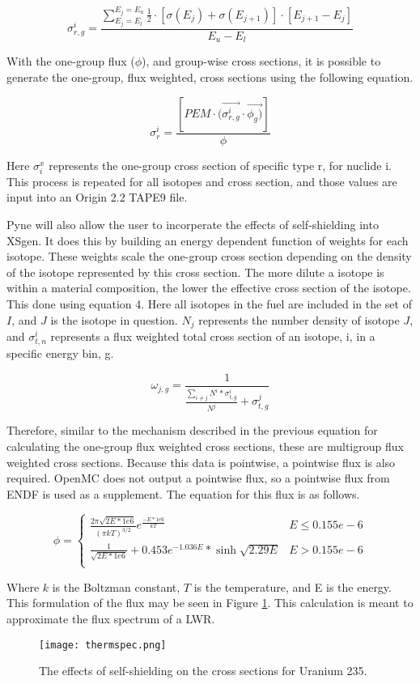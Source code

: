 \documentclass{article}
\begin{document}
\[ \sigma_{r,g}^i = \frac{\sum_{E_j=E_l}^{E_j=E_u} \frac{1}{2} \cdot[\sigma(E_j)+\sigma(E_{j+1})]\cdot[E_{j+1}-E_{j}]}{E_u-E_l} \tag{2} \label{eq2} \]


With the one-group flux ($\phi$), and group-wise cross sections, it is possible to generate the one-group, flux weighted, cross sections using the following equation.

\[ \sigma_{r}^i=\frac{[PEM \cdot (\vec{\sigma_{r,g}^i} \cdot \vec{\phi_g)}]}{\phi} \tag{3} \label{eq3} \]

Here $\sigma_{i}^x$ represents the one-group cross section of specific type r, for nuclide i. This process is repeated for all isotopes and cross section, and those values are input into an Origin 2.2 TAPE9\cite{origen2} file.

Pyne will also allow the user to incorperate the effects of self-shielding into XSgen. It does this by building an energy dependent function of weights for each isotope. These weights scale the one-group cross section depending on the density of the isotope represented by this cross section. The more dilute a isotope is within a material composition, the lower the effective cross section of the isotope. This done using equation 4. Here all isotopes in the fuel are included in the set of $I$, and $J$ is the isotope in question. $N_j$ represents the number density of isotope $J$, and $\sigma_{t,n}^i$ represents a flux weighted total cross section of an isotope, i, in a specific energy bin, g.

\[ \omega_{j,g}=\frac{1}{\frac{\sum_{i\neq j}N^i * \sigma_{t,g}^i}{N^j}+\sigma_{t,g}^j} \tag{4} \label{eq4} \]

Therefore, similar to the mechanism described in the previous equation for calculating the one-group flux weighted cross sections, these are multigroup flux weighted cross sections. Because this data is pointwise, a pointwise flux is also required. OpenMC does not output a pointwise flux, so a pointwise flux from ENDF is used as a supplement. The equation for this flux is as follows.


\[ \phi = \begin{cases}
      \frac{2\pi\sqrt{2E*1e6}}{(\pi kT)^{3/2}}e^{\frac{-E*1e6}{kT}} & E\leq 0.155e-6 \\
      \frac{1}{\sqrt{2E*1e6}} + 0.453e^{-1.036E}*\sinh{\sqrt{2.29E}} & E > 0.155e-6 \\
   \end{cases} \tag{5} \label{eq5}
\]

Where $k$ is the Boltzman constant, $T$ is the temperature, and E is the energy. This formulation of the flux may be seen in Figure \ref{fig:therm}. This calculation is meant to approximate the flux spectrum of a LWR\cite{spectrum}.
\begin{figure}[h]
  \center
  \texttt{[image: thermspec.png]}
  \caption{The effects of self-shielding on the cross sections for Uranium 235.}
  \label{fig:therm}
\end{figure}
\end{document}
